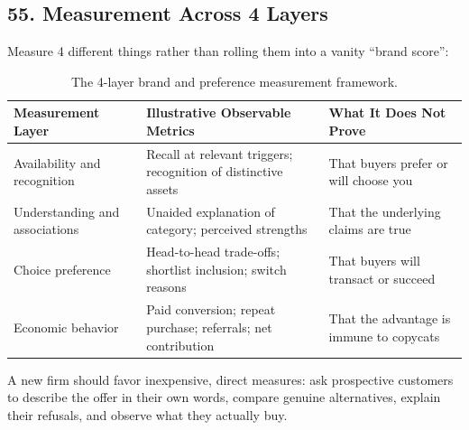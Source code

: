 \subsection*{55. Measurement Across 4 Layers}

Measure 4 different things rather than rolling them into a vanity ``brand score'':

\begin{table}[t]
\centering
\small
\begin{tabularx}{\textwidth}{>{\raggedright\arraybackslash}p{3.2cm} >{\raggedright\arraybackslash}p{6.8cm} >{\raggedright\arraybackslash}X}
\toprule
\textbf{Measurement Layer} & \textbf{Illustrative Observable Metrics} & \textbf{What It Does Not Prove} \\
\midrule
Availability and recognition & Recall at relevant triggers; recognition of distinctive assets & That buyers prefer or will choose you \\
Understanding and associations & Unaided explanation of category; perceived strengths & That the underlying claims are true \\
Choice preference & Head-to-head trade-offs; shortlist inclusion; switch reasons & That buyers will transact or succeed \\
Economic behavior & Paid conversion; repeat purchase; referrals; net contribution & That the advantage is immune to copycats \\
\bottomrule
\end{tabularx}
\caption{The 4-layer brand and preference measurement framework.}
\label{tab:ch8-brand-metrics}
\end{table}

A new firm should favor inexpensive, direct measures: ask prospective customers to describe the offer in their own words, compare genuine alternatives, explain their refusals, and observe what they actually buy.

